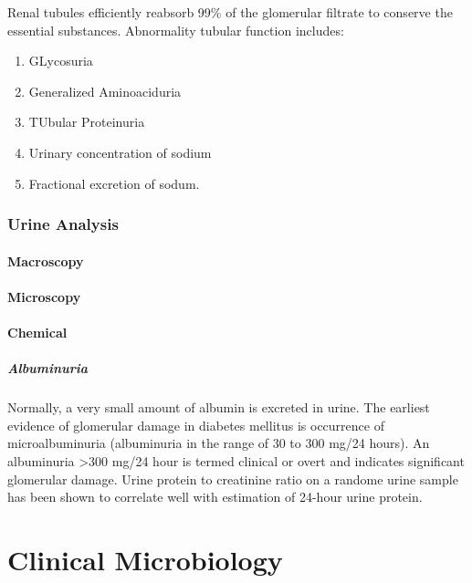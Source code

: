 \documentclass[
  letterpaper,
  DIV=11,
  numbers=noendperiod]{scrreprt}
\let\oldparagraph\paragraph
\renewcommand{\paragraph}[1]{\oldparagraph{#1}\mbox{}}
\begin{document}
Renal tubules efficiently reabsorb 99\% of the glomerular filtrate to
conserve the essential substances. Abnormality tubular function
includes:

\begin{enumerate}
\def\labelenumi{\arabic{enumi}.}
\item
  GLycosuria
\item
  Generalized Aminoaciduria
\item
  TUbular Proteinuria
\item
  Urinary concentration of sodium
\item
  Fractional excretion of sodum.
\end{enumerate}

\subsection{Urine Analysis}\label{urine-analysis}

\subsubsection{Macroscopy}\label{macroscopy}

\subsubsection{Microscopy}\label{microscopy}

\subsubsection{Chemical}\label{chemical}

\paragraph{Albuminuria}\label{albuminuria}

Normally, a very small amount of albumin is excreted in urine. The
earliest evidence of glomerular damage in diabetes mellitus is
occurrence of microalbuminuria (albuminuria in the range of 30 to 300
mg/24 hours). An albuminuria \textgreater300 mg/24 hour is termed
clinical or overt and indicates significant glomerular damage. Urine
protein to creatinine ratio on a randome urine sample has been shown to
correlate well with estimation of 24-hour urine protein.

\chapter{Clinical Microbiology}\label{clinical-microbiology}
\end{document}
